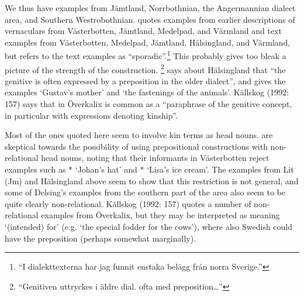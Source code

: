 {%
We thus have examples from Jämtland, Norrbothnian, the Angermannian dialect area, and Southern Westrobothnian. \citet[44]{Delsing2003a} quotes examples from earlier descriptions of vernaculars from Västerbotten, Jämtland, Medelpad, and Värmland and text examples from Västerbotten, Medelpad, Jämtland, Hälsingland, and Värmland, but refers to the text examples as “sporadic”.\footnote{ “I dialekttexterna har jag funnit enstaka belägg från norra Sverige.” } This probably gives too bleak a picture of the strength of the construction. \citet[61]{Hedblom1978}\footnote{ “Genitiven uttryckes i äldre dial. ofta med preposition…” } says about Hälsingland that “the genitive is often expressed by a preposition in the older dialect”, and gives the examples  ‘Gustav’s mother’ and ‘the fastenings of the animals’. Källskog (1992: 157) says that in Överkalix  is common as a “paraphrase of the genitive concept, in particular with expressions denoting kinship”. 


Most of the ones quoted here seem to involve kin terms as head nouns. \citet{BergholmEtAl1999} are skeptical towards the possibility of using prepositional constructions with non-relational head nouns, noting that their informants in Västerbotten reject examples such as * ‘Johan’s hat’ and * ‘Lisa’s ice cream’. The examples from Lit (Jm) and Hälsingland above seem to show that this restriction is not general, and some of Delsing’s examples from the southern part of the area also seem to be quite clearly non-relational. Källskog (1992: 157) quotes a number of non-relational examples from Överkalix, but they may be interpreted as meaning ‘(intended) for’ (e.g.  ‘the special fodder for the cows’), where also Swedish could have the preposition  (perhaps somewhat marginally). 


}
